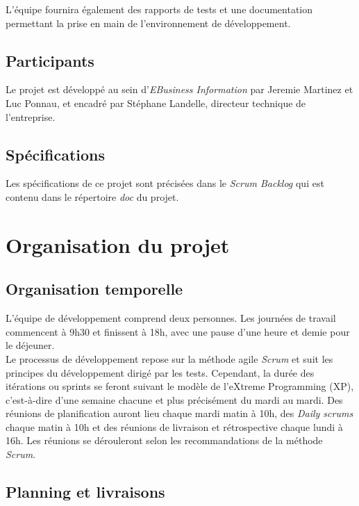 \documentclass[11pt]{article}
\begin{document}
L'équipe fournira également des rapports de tests et une documentation permettant la prise en main de l'environnement de développement.

\subsection{Participants}

Le projet est développé au sein d'\emph{EBusiness Information} par
Jeremie Martinez et Luc Ponnau, et encadré par Stéphane Landelle, directeur
technique de l'entreprise. 

\subsection{Spécifications}

Les spécifications de ce projet sont précisées dans le \emph{Scrum Backlog} qui est contenu dans le répertoire \emph{doc} du projet.

\section{Organisation du projet}

\subsection{Organisation temporelle}

L'équipe de développement comprend deux personnes. Les journées de travail
commencent à 9h30 et finissent à 18h, avec une pause d'une heure et demie
pour le déjeuner.\\

Le processus de développement repose sur la méthode agile \emph{Scrum} et suit les
principes du développement dirigé par les tests. Cependant, la durée des itérations ou sprints se feront suivant le modèle de l'eXtreme Programming (XP), c'est-à-dire d'une semaine chacune et plus précisément du mardi au mardi. Des réunions de planification auront lieu
chaque mardi matin à 10h, des \emph{Daily scrums} chaque matin à 10h et des
réunions de livraison et rétrospective chaque lundi à 16h. Les réunions
se dérouleront selon les recommandations de la méthode \emph{Scrum}.\\

\subsection{Planning et livraisons}
\end{document}

